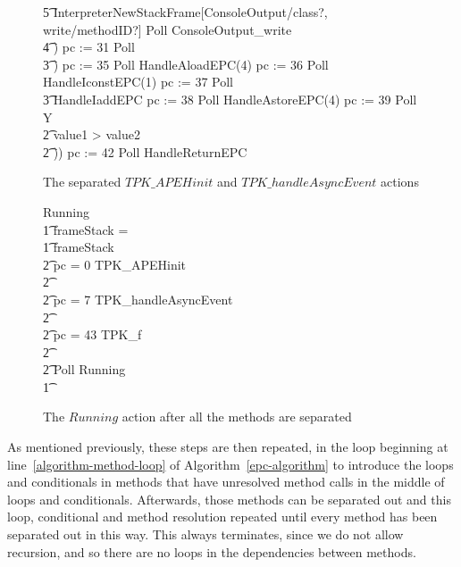 \begin{figure}[tp!]
{\begin{circus}
    \t5 \lschexpract InterpreterNewStackFrame[ConsoleOutput/class?, write/methodID?] \rschexpract \circseq  Poll \circseq ConsoleOutput\_write \\
    \t4 \circfi) \circseq pc := 31 \circseq Poll \\
    \t3 \circfi) \circseq pc := 35 \circseq Poll \circseq HandleAloadEPC(4) \circseq pc := 36 \circseq Poll \circseq HandleIconstEPC(1) \circseq pc := 37 \circseq Poll \circseq \\
    \t3 HandleIaddEPC \circseq pc := 38 \circseq Poll \circseq HandleAstoreEPC(4) \circseq pc := 39 \circseq Poll \circseq Y \\
    \t2 {} \circelse value1 > value2 \circthen \Skip \\
    \t2 \circfi)) \circseq pc := 42 \circseq Poll \circseq HandleReturnEPC \\
  \end{circus}
  }
  \caption{The separated $TPK\_APEHinit$ and $TPK\_handleAsyncEvent$ actions}
  \label{method-separation-handleAsyncEvent-example-figure}
\end{figure}

\begin{figure}[tp!]
  \setlength{\zedindent}{0cm}
  \setlength{\zedtab}{0.3cm}
  \setlength{\zedleftsep}{0cm}
  \setlength{\abovedisplayskip}{0cm}
  \setlength{\belowdisplayskip}{0cm}
  \begin{circus}
    Running \circdef \\
    \t1 \circif frameStack = \emptyset \circthen \Skip \\
    \t1 {} \circelse frameStack \neq \emptyset \circthen {} \\
    \t2 {} \circif pc = 0 \circthen TPK\_APEHinit \\
    \t2 {} \cdots {} \\
    \t2 {} \circelse pc = 7 \circthen TPK\_handleAsyncEvent \\
    \t2 {} \cdots {} \\
    \t2 {} \circelse pc = 43 \circthen TPK\_f \\
    \t2 {} \cdots {} \\
    \t2 \circfi \circseq Poll \circseq Running \\
    \t1 \circfi
  \end{circus}
  \caption{The $Running$ action after all the methods are separated}
  \label{final-method-separation-example-figure}
\end{figure}

As mentioned previously, these steps are then repeated, in the loop
beginning at line~\ref{algorithm-method-loop} of
Algorithm~\ref{epc-algorithm} to introduce the loops and conditionals
in methods that have unresolved method calls in the middle of loops
and conditionals.
Afterwards, those methods can be separated out and this loop,
conditional and method resolution repeated until every method has been
separated out in this way.
This always terminates, since we do not allow recursion, and so there
are no loops in the dependencies between methods.


